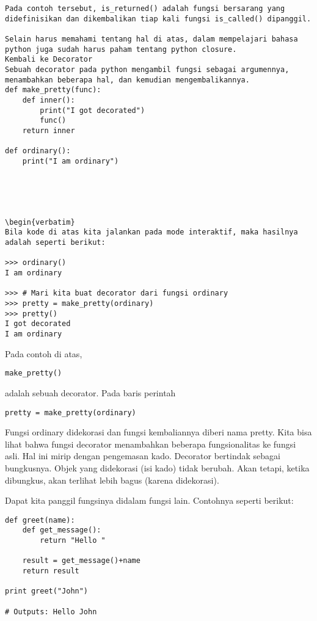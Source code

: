 \documentclass[12pt,a4paper]{article}
\begin{document}
\begin{verbatim}
Pada contoh tersebut, is_returned() adalah fungsi bersarang yang didefinisikan dan dikembalikan tiap kali fungsi is_called() dipanggil.

Selain harus memahami tentang hal di atas, dalam mempelajari bahasa python juga sudah harus paham tentang python closure.
Kembali ke Decorator
Sebuah decorator pada python mengambil fungsi sebagai argumennya, menambahkan beberapa hal, dan kemudian mengembalikannya.
def make_pretty(func):
    def inner():
        print("I got decorated")
        func()
    return inner

def ordinary():
    print("I am ordinary")





\begin{verbatim}
Bila kode di atas kita jalankan pada mode interaktif, maka hasilnya adalah seperti berikut:

>>> ordinary()
I am ordinary

>>> # Mari kita buat decorator dari fungsi ordinary
>>> pretty = make_pretty(ordinary)
>>> pretty()
I got decorated
I am ordinary

\end{verbatim}

Pada contoh di atas, 
\begin{verbatim}
make_pretty()
\end{verbatim}  
adalah sebuah decorator. Pada baris perintah 

\begin{verbatim}
pretty = make_pretty(ordinary)
\end{verbatim}

Fungsi ordinary didekorasi dan fungsi kembaliannya diberi nama pretty.
Kita bisa lihat bahwa fungsi decorator menambahkan beberapa fungsionalitas ke fungsi asli. Hal ini mirip dengan pengemasan kado. Decorator bertindak sebagai bungkusnya. Objek yang didekorasi (isi kado) tidak berubah. Akan tetapi, ketika dibungkus, akan terlihat lebih bagus (karena didekorasi).

Dapat kita panggil fungsinya didalam fungsi lain.
Contohnya seperti berikut:

\begin{verbatim}
def greet(name):
    def get_message():
        return "Hello "

    result = get_message()+name
    return result

print greet("John")

# Outputs: Hello John
\end{verbatim}
\end{document}
